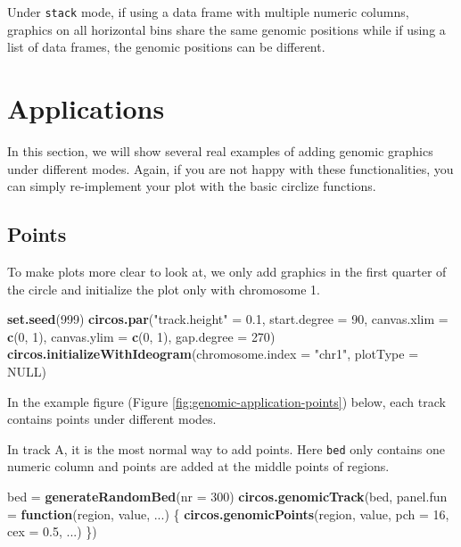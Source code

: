 \documentclass[]{book}
\newenvironment{Shaded}{\begin{snugshade}}{\end{snugshade}}
\newcommand{\KeywordTok}[1]{\textcolor[rgb]{0.13,0.29,0.53}{\textbf{#1}}}
\newcommand{\DataTypeTok}[1]{\textcolor[rgb]{0.13,0.29,0.53}{#1}}
\newcommand{\DecValTok}[1]{\textcolor[rgb]{0.00,0.00,0.81}{#1}}
\newcommand{\FloatTok}[1]{\textcolor[rgb]{0.00,0.00,0.81}{#1}}
\newcommand{\StringTok}[1]{\textcolor[rgb]{0.31,0.60,0.02}{#1}}
\newcommand{\OtherTok}[1]{\textcolor[rgb]{0.56,0.35,0.01}{#1}}
\newcommand{\ControlFlowTok}[1]{\textcolor[rgb]{0.13,0.29,0.53}{\textbf{#1}}}
\newcommand{\NormalTok}[1]{#1}
\begin{document}
Under \texttt{stack} mode, if using a data frame with multiple numeric
columns, graphics on all horizontal bins share the same genomic
positions while if using a list of data frames, the genomic positions
can be different.

\section{Applications}\label{applications}

In this section, we will show several real examples of adding genomic
graphics under different modes. Again, if you are not happy with these
functionalities, you can simply re-implement your plot with the basic
circlize functions.

\subsection{Points}\label{modes-points}

To make plots more clear to look at, we only add graphics in the first
quarter of the circle and initialize the plot only with chromosome 1.

\begin{Shaded}
\begin{Highlighting}[]
\KeywordTok{set.seed}\NormalTok{(}\DecValTok{999}\NormalTok{)}
\KeywordTok{circos.par}\NormalTok{(}\StringTok{"track.height"}\NormalTok{ =}\StringTok{ }\FloatTok{0.1}\NormalTok{, }\DataTypeTok{start.degree =} \DecValTok{90}\NormalTok{,}
    \DataTypeTok{canvas.xlim =} \KeywordTok{c}\NormalTok{(}\DecValTok{0}\NormalTok{, }\DecValTok{1}\NormalTok{), }\DataTypeTok{canvas.ylim =} \KeywordTok{c}\NormalTok{(}\DecValTok{0}\NormalTok{, }\DecValTok{1}\NormalTok{), }\DataTypeTok{gap.degree =} \DecValTok{270}\NormalTok{)}
\KeywordTok{circos.initializeWithIdeogram}\NormalTok{(}\DataTypeTok{chromosome.index =} \StringTok{"chr1"}\NormalTok{, }\DataTypeTok{plotType =} \OtherTok{NULL}\NormalTok{)}
\end{Highlighting}
\end{Shaded}

In the example figure (Figure \ref{fig:genomic-application-points})
below, each track contains points under different modes.

In track A, it is the most normal way to add points. Here \texttt{bed}
only contains one numeric column and points are added at the middle
points of regions.

\begin{Shaded}
\begin{Highlighting}[]
\NormalTok{bed =}\StringTok{ }\KeywordTok{generateRandomBed}\NormalTok{(}\DataTypeTok{nr =} \DecValTok{300}\NormalTok{)}
\KeywordTok{circos.genomicTrack}\NormalTok{(bed, }\DataTypeTok{panel.fun =} \ControlFlowTok{function}\NormalTok{(region, value, ...) \{}
    \KeywordTok{circos.genomicPoints}\NormalTok{(region, value, }\DataTypeTok{pch =} \DecValTok{16}\NormalTok{, }\DataTypeTok{cex =} \FloatTok{0.5}\NormalTok{, ...)}
\NormalTok{\})}
\end{Highlighting}
\end{Shaded}
\end{document}
